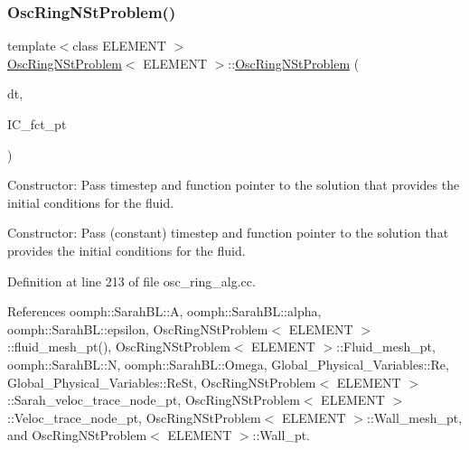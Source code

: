 \subsubsection{\texorpdfstring{Osc\+Ring\+N\+St\+Problem()}{OscRingNStProblem()}\hspace{0.1cm}{\footnotesize\ttfamily [1/2]}}
{\footnotesize\ttfamily template$<$class E\+L\+E\+M\+E\+NT $>$ \\
\hyperlink{classOscRingNStProblem}{Osc\+Ring\+N\+St\+Problem}$<$ E\+L\+E\+M\+E\+NT $>$\+::\hyperlink{classOscRingNStProblem}{Osc\+Ring\+N\+St\+Problem} (\begin{DoxyParamCaption}\item[{const double \&}]{dt,  }\item[{Finite\+Element\+::\+Unsteady\+Exact\+Solution\+Fct\+Pt}]{I\+C\+\_\+fct\+\_\+pt }\end{DoxyParamCaption})}



Constructor\+: Pass timestep and function pointer to the solution that provides the initial conditions for the fluid. 

Constructor\+: Pass (constant) timestep and function pointer to the solution that provides the initial conditions for the fluid. 

Definition at line 213 of file osc\+\_\+ring\+\_\+alg.\+cc.



References oomph\+::\+Sarah\+B\+L\+::A, oomph\+::\+Sarah\+B\+L\+::alpha, oomph\+::\+Sarah\+B\+L\+::epsilon, Osc\+Ring\+N\+St\+Problem$<$ E\+L\+E\+M\+E\+N\+T $>$\+::fluid\+\_\+mesh\+\_\+pt(), Osc\+Ring\+N\+St\+Problem$<$ E\+L\+E\+M\+E\+N\+T $>$\+::\+Fluid\+\_\+mesh\+\_\+pt, oomph\+::\+Sarah\+B\+L\+::N, oomph\+::\+Sarah\+B\+L\+::\+Omega, Global\+\_\+\+Physical\+\_\+\+Variables\+::\+Re, Global\+\_\+\+Physical\+\_\+\+Variables\+::\+Re\+St, Osc\+Ring\+N\+St\+Problem$<$ E\+L\+E\+M\+E\+N\+T $>$\+::\+Sarah\+\_\+veloc\+\_\+trace\+\_\+node\+\_\+pt, Osc\+Ring\+N\+St\+Problem$<$ E\+L\+E\+M\+E\+N\+T $>$\+::\+Veloc\+\_\+trace\+\_\+node\+\_\+pt, Osc\+Ring\+N\+St\+Problem$<$ E\+L\+E\+M\+E\+N\+T $>$\+::\+Wall\+\_\+mesh\+\_\+pt, and Osc\+Ring\+N\+St\+Problem$<$ E\+L\+E\+M\+E\+N\+T $>$\+::\+Wall\+\_\+pt.

\mbox{\label{classOscRingNStProblem_a96e43adf75d4e33270218ceb3397443c}} 

